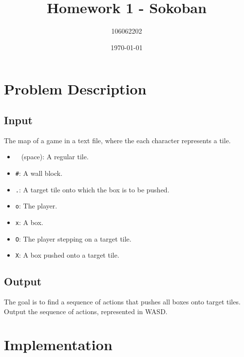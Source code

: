 \documentclass[a4paper, 11pt]{article}
\title{Homework 1 - Sokoban}
\author{106062202}
\date{\today}
\begin{document}
    \maketitle

    \section{Problem Description}

        \subsection{Input}
            The map of a game in a text file, where the each character represents a tile.
            \begin{itemize}
                \item \texttt{ } (space): A regular tile.
                \item \texttt{\#}: A wall block.
                \item \texttt{.}: A target tile onto which the box is to be pushed.
                \item \texttt{o}: The player.
                \item \texttt{x}: A box.
                \item \texttt{O}: The player stepping on a target tile.
                \item \texttt{X}: A box pushed onto a target tile.
            \end{itemize}

        \subsection{Output}
            The goal is to find a sequence of actions that pushes all boxes onto target tiles.
            Output the sequence of actions, represented in WASD.

    \pagebreak

    \section{Implementation}
\end{document}
